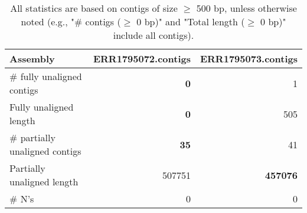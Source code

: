 \documentclass[12pt,a4paper]{article}
\begin{document}
\begin{table}[ht]
\begin{center}
\caption{All statistics are based on contigs of size $\geq$ 500 bp, unless otherwise noted (e.g., "\# contigs ($\geq$ 0 bp)" and "Total length ($\geq$ 0 bp)" include all contigs).}
\begin{tabular}{|l*{2}{|r}|}
\hline
Assembly & ERR1795072.contigs & ERR1795073.contigs \\ \hline
\# fully unaligned contigs & {\bf 0} & 1 \\ \hline
Fully unaligned length & {\bf 0} & 505 \\ \hline
\# partially unaligned contigs & {\bf 35} & 41 \\ \hline
Partially unaligned length & 507751 & {\bf 457076} \\ \hline
\# N's & 0 & 0 \\ \hline
\end{tabular}
\end{center}
\end{table}
\end{document}
